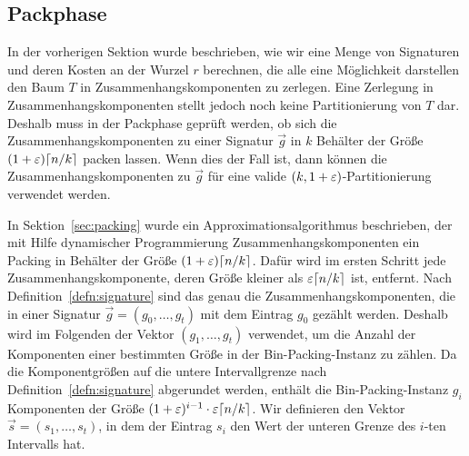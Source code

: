 \subsection{Packphase}\label{sec:packingimpl}
In der vorherigen Sektion wurde beschrieben, wie wir eine Menge von Signaturen und deren Kosten an der Wurzel $r$ berechnen, die alle eine Möglichkeit darstellen den Baum $T$ in Zusammenhangskomponenten zu zerlegen.
Eine Zerlegung in Zusammenhangskomponenten stellt jedoch noch keine Partitionierung von $T$ dar.
Deshalb muss in der Packphase geprüft werden, ob sich die Zusammenhangskomponenten zu einer Signatur $\vec{g}$ in $k$ Behälter der Größe $(1+\varepsilon)\lceil n/k\rceil$ packen lassen.
Wenn dies der Fall ist, dann können die Zusammenhangskomponenten zu $\vec{g}$ für eine valide $(k,1+\varepsilon)$\hyp Partitionierung verwendet werden.

In Sektion~\ref{sec:packing} wurde ein Approximationsalgorithmus beschrieben, der mit Hilfe dynamischer Programmierung Zusammenhangskomponenten ein Packing in Behälter der Größe $(1+\varepsilon)\lceil n/k\rceil$.
Dafür wird im ersten Schritt jede Zusammenhangskomponente, deren Größe kleiner als $\varepsilon \lceil n/k\rceil$ ist, entfernt.
Nach Definition~\ref{defn:signature} sind das genau die Zusammenhangskomponenten, die in einer Signatur $\vec{g} = (g_0, \ldots, g_t)$ mit dem Eintrag $g_0$ gezählt werden.
Deshalb wird im Folgenden der Vektor $(g_1, \ldots, g_t)$ verwendet, um die Anzahl der Komponenten einer bestimmten Größe in der Bin-Packing-Instanz zu zählen.
Da die Komponentgrößen auf die untere Intervallgrenze nach Definition~\ref{defn:signature} abgerundet werden, enthält die Bin-Packing-Instanz $g_i$ Komponenten der Größe $(1+\varepsilon)^{i-1} \cdot \varepsilon \lceil n/k\rceil$.
Wir definieren den Vektor $\vec{s} = (s_1, \ldots, s_t)$, in dem der Eintrag $s_i$ den Wert der unteren Grenze des $i$\hyp ten Intervalls hat.


